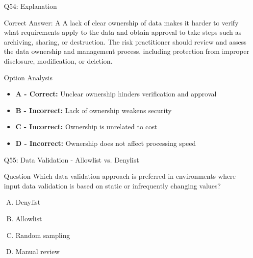 \documentclass{beamer}
\begin{document}
	\begin{frame}{Q54: Explanation}
		\begin{block}{Correct Answer: A}
			A lack of clear ownership of data makes it harder to verify what requirements apply to the data and obtain approval to take steps such as archiving, sharing, or destruction. The risk practitioner should review and assess the data ownership and management process, including protection from improper disclosure, modification, or deletion.
		\end{block}
		\begin{block}{Option Analysis}
			\begin{itemize}
				\item \textbf{A - Correct:} Unclear ownership hinders verification and approval
				\item \textbf{B - Incorrect:} Lack of ownership weakens security
				\item \textbf{C - Incorrect:} Ownership is unrelated to cost
				\item \textbf{D - Incorrect:} Ownership does not affect processing speed
			\end{itemize}
		\end{block}
	\end{frame}
	
	\begin{frame}{Q55: Data Validation - Allowlist vs. Denylist}
		\begin{block}{Question}
			Which data validation approach is preferred in environments where input data validation is based on static or infrequently changing values?
		\end{block}
		\begin{enumerate}[(A)]
			\item Denylist
			\item Allowlist
			\item Random sampling
			\item Manual review
		\end{enumerate}
	\end{frame}
	
\end{document}

